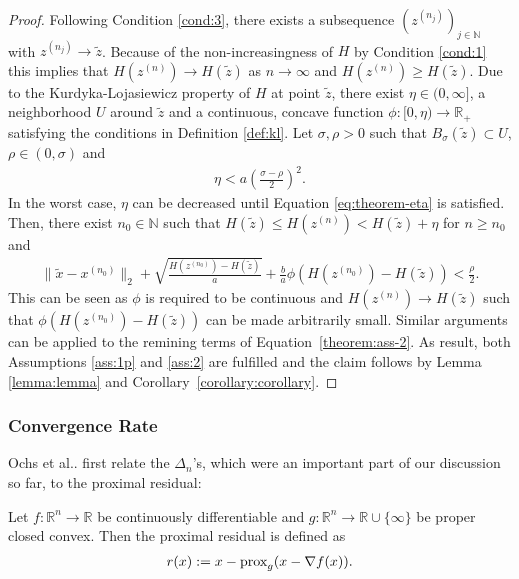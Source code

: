 \documentclass[onecolumn,final,a4paper,13pt,reqno]{siamart}
\makeatletter
\DeclareRobustCommand\onedot{\futurelet\@let@token\@onedot}
\def\@onedot{\ifx\@let@token.\else.\null\fi\xspace}
\def\etal{{et al}\onedot}
\DeclareRobustCommand{\prox}[1]{%
    \ifmmode
        \text{prox}_{#1}
    \else
        $\text{prox}_{#1}$
    \fi
}
\makeatother
\begin{document}
\begin{proof}
	Following Condition \ref{cond:3}, there exists a subsequence $(z^{(n_j)})_{j \in \mathbb{N}}$ with $z^{(n_j)} \rightarrow \tilde{z}$. Because of the non-increasingness of $H$ by Condition \ref{cond:1} this implies that $H(z^{(n)}) \rightarrow H(\tilde{z})$ as $n \rightarrow \infty$ and $H(z^{(n)}) \geq H(\tilde{z})$. Due to the Kurdyka-Lojasiewicz property of $H$ at point $\tilde{z}$, there exist $\eta \in (0, \infty]$, a neighborhood $U$ around $\tilde{z}$ and a continuous, concave function $\phi: [0, \eta) \rightarrow \mathbb{R}_+$ satisfying the conditions in Definition \ref{def:kl}. Let $\sigma, \rho > 0$ such that $B_\sigma(\tilde{z}) \subset U$, $\rho \in (0, \sigma)$ and
	\begin{align}
		\eta < a \left(\frac{\sigma - \rho}{2}\right)^2.\label{eq:theorem-eta}
	\end{align}
	In the worst case, $\eta$ can be decreased until Equation \eqref{eq:theorem-eta} is satisfied. Then, there exist $n_0 \in \mathbb{N}$ such that $H(\tilde{z}) \leq H(z^{(n)}) < H(\tilde{z}) + \eta$ for $n \geq n_0$ and
	 \begin{align}
	 	\|\tilde{x} - x^{(n_0)}\|_2 + \sqrt{\frac{H(z^{(n_0)}) - H(\tilde{z})}{a}} + \frac{b}{a} \phi(H(z^{(n_0)}) - H(\tilde{z})) < \frac{\rho}{2}.\label{theorem:ass-2}
	 \end{align}
	 This can be seen as $\phi$ is required to be continuous and $H(z^{(n)}) \rightarrow H(\tilde{z})$ such that $\phi(H(z^{(n_0)}) - H(\tilde{z}))$ can be made arbitrarily small. Similar arguments can be applied to the remining terms of Equation~\eqref{theorem:ass-2}. As result, both Assumptions \ref{ass:1p} and \ref{ass:2} are fulfilled and the claim follows by Lemma \ref{lemma:lemma} and Corollary~\ref{corollary:corollary}.
\end{proof}

\subsubsection{Convergence Rate}
\label{subsec:ipiano-rate}

Ochs \etal first relate the $\Delta_n$'s, which were an important part of our discussion so far, to the proximal residual:

\begin{definitionmd}
	Let $f : \mathbb{R}^n \rightarrow \mathbb{R}$ be continuously differentiable and $g : \mathbb{R}^n \rightarrow \mathbb{R} \cup \{\infty\}$ be proper closed convex. Then the proximal residual is defined as
	\begin{align}
		r(x) := x - \prox{g}(x - \nabla f(x)).
	\end{align}\label{def:residual}
\end{definitionmd}
\end{document}
